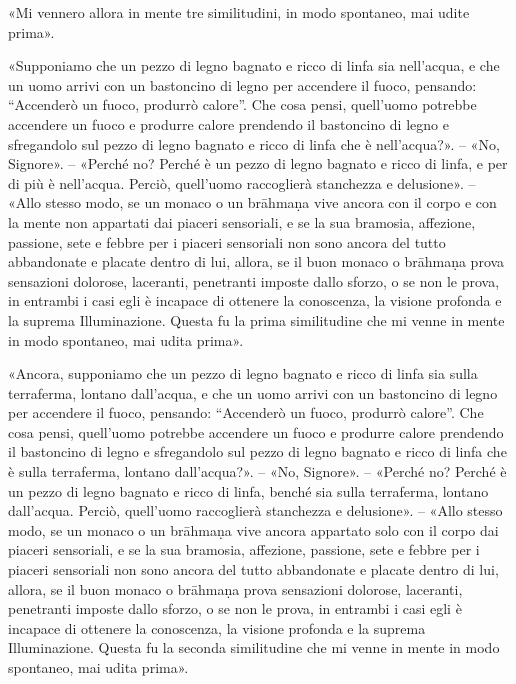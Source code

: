 

«Mi vennero allora in mente tre similitudini, in modo spontaneo, mai
udite prima».


«Supponiamo che un pezzo di legno bagnato e ricco di linfa sia
nell’acqua, e che un uomo arrivi con un bastoncino di legno per
accendere il fuoco, pensando: “Accenderò un fuoco, produrrò calore”. Che
cosa pensi, quell’uomo potrebbe accendere un fuoco e produrre calore
prendendo il bastoncino di legno e sfregandolo sul pezzo di legno
bagnato e ricco di linfa che è nell’acqua?». – «No, Signore». – «Perché
no? Perché è un pezzo di legno bagnato e ricco di linfa, e per di più è
nell’acqua. Perciò, quell’uomo raccoglierà stanchezza e delusione». –
«Allo stesso modo, se un monaco o un brāhmaṇa vive ancora con il corpo e
con la mente non appartati dai piaceri sensoriali, e se la sua bramosia,
affezione, passione, sete e febbre per i piaceri sensoriali non sono
ancora del tutto abbandonate e placate dentro di lui, allora, se il buon
monaco o brāhmaṇa prova sensazioni dolorose, laceranti, penetranti
imposte dallo sforzo, o se non le prova, in entrambi i casi egli è
incapace di ottenere la conoscenza, la visione profonda e la suprema
Illuminazione. Questa fu la prima similitudine che mi venne in mente in
modo spontaneo, mai udita prima».


«Ancora, supponiamo che un pezzo di legno bagnato e ricco di linfa sia
sulla terraferma, lontano dall’acqua, e che un uomo arrivi con un
bastoncino di legno per accendere il fuoco, pensando: “Accenderò un
fuoco, produrrò calore”. Che cosa pensi, quell’uomo potrebbe accendere
un fuoco e produrre calore prendendo il bastoncino di legno e
sfregandolo sul pezzo di legno bagnato e ricco di linfa che è sulla
terraferma, lontano dall’acqua?». – «No, Signore». – «Perché no? Perché è
un pezzo di legno bagnato e ricco di linfa, benché sia sulla terraferma,
lontano dall’acqua. Perciò, quell’uomo raccoglierà stanchezza e
delusione». – «Allo stesso modo, se un monaco o un brāhmaṇa vive ancora
appartato solo con il corpo dai piaceri sensoriali, e se la sua
bramosia, affezione, passione, sete e febbre per i piaceri sensoriali
non sono ancora del tutto abbandonate e placate dentro di lui, allora,
se il buon monaco o brāhmaṇa prova sensazioni dolorose, laceranti,
penetranti imposte dallo sforzo, o se non le prova, in entrambi i casi
egli è incapace di ottenere la conoscenza, la visione profonda e la
suprema Illuminazione. Questa fu la seconda similitudine che mi venne in
mente in modo spontaneo, mai udita prima».


